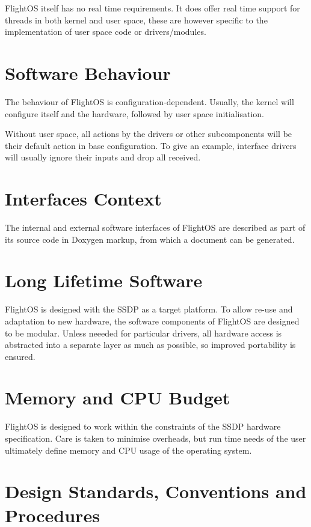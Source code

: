 FlightOS itself has no real time requirements. It does offer real time support for
threads in both kernel and user space, these are however specific to the
implementation of user space code or drivers/modules.

\section{Software Behaviour}

The behaviour of FlightOS is configuration-dependent. Usually, the kernel will
configure itself and the hardware, followed by user space initialisation.

Without user space, all actions by the drivers or other subcomponents will be
their default action in base configuration. To give an example, interface
drivers will usually ignore their inputs and drop all received.




\section{Interfaces Context}

The internal and external software interfaces of FlightOS are described as part
of its source code in Doxygen markup, from which a document can be generated.

\section{Long Lifetime Software}

FlightOS is designed with the \gls{SSDP} as a target platform. To allow re-use
and adaptation to new hardware, the software components of FlightOS are designed
to be modular. Unless neeeded for particular drivers, all hardware access is
abstracted into a separate layer as much as possible, so improved portability
is ensured.


\section{Memory and CPU Budget}

FlightOS is designed to work within the constraints of the \gls{SSDP} hardware
specification. Care is taken to minimise overheads, but run time needs of the
user ultimately define memory and CPU usage of the operating system.


\section{Design Standards, Conventions and Procedures}

